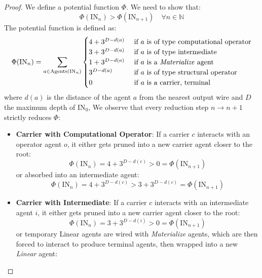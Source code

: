 \begin{proof}
	We define a potential function $\Phi$. We need to show that:
	\begin{equation}
	\Phi(\text{IN}_n) > \Phi(\text{IN}_{n+1}) \quad \forall n \in \mathbb{N}
	\end{equation}
	The potential function is defined as:
	\begin{equation}
	\Phi(\text{IN}_n) = \sum_{a \in \text{Agents}(\text{IN}_n)} \begin{cases}
		4 + 3^{D-d(a)} & \text{ if }a\text{ is of type computational operator} \\
		3 + 3^{D-d(a)} & \text{ if }a\text{ is of type intermediate} \\
		1 + 3^{D-d(a)} & \text{ if }a\text{ is a \textit{Materialize} agent} \\
		3^{D-d(a)} & \text{ if }a\text{ is of type structural operator} \\
		0 & \text{ if }a\text{ is a carrier, terminal}
	\end{cases}
	\end{equation}
	where $d(a)$ is the distance of the agent $a$ from the nearest output wire and $D$ the maximum depth
	of $\text{IN}_0$,
	We observe that every reduction step $n \to n+1$ strictly reduces $\Phi$:
	\begin{itemize}
		\item \textbf{Carrier with Computational Operator}: If a carrier $c$ interacts with an operator agent $o$, it
			either gets pruned into a new carrier agent closer to the root:
			\begin{equation}
			\Phi(\text{IN}_n) = 4 + 3^{D-d(c)} > 0 = \Phi(\text{IN}_{n+1})
			\end{equation}
			or absorbed into an intermediate agent:
			\begin{equation}
			\Phi(\text{IN}_n) = 4 + 3^{D-d(c)} > 3 + 3^{D-d(c)} = \Phi(\text{IN}_{n+1})
			\end{equation}
		\item \textbf{Carrier with Intermediate}: If a carrier $c$ interacts with an intermediate agent $i$, it
			either gets pruned into a new carrier agent closer to the root:
			\begin{equation}
			\Phi(\text{IN}_n) = 3 + 3^{D-d(i)} > 0 = \Phi(\text{IN}_{n+1})
			\end{equation}
			or temporary Linear agents are wired with \textit{Materialize} agents, which are then forced to
			interact to produce terminal agents, then wrapped into a new \textit{Linear} agent:
			\begin{equation}

\end{equation}
\end{itemize}
\end{proof}
